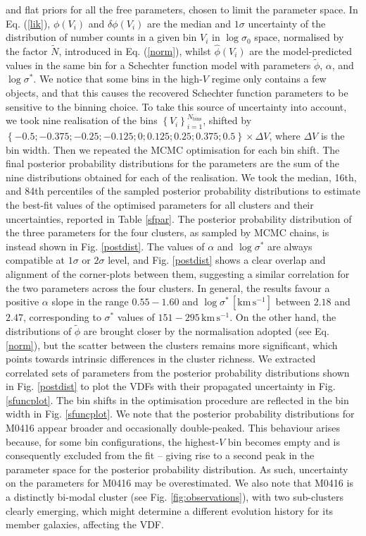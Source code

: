 \documentclass{aa}
\begin{document}
and flat priors for all the free parameters, chosen to limit the parameter space. In Eq. (\ref{lik}), $\phi(V_i)$ and $\delta\phi(V_i)$ are the median and $1\sigma$ uncertainty of the distribution of number counts in a given bin $V_i$ in $\log \sigma_0$ space, normalised by the factor $\tilde{N}$, introduced in Eq. (\ref{norm}), whilst $\hat{\phi}(V_i)$ are the model-predicted values in the same bin for a Schechter function model with parameters $\tilde{\phi}$, $\alpha$, and $\log\sigma^*$. We notice that some bins in the high-$V$ regime only contains a few objects, and that this causes the recovered Schechter function parameters to be sensitive to the binning choice. To take this source of uncertainty into account, we took nine realisation of the bins $\left\{ V_i \right\}_{i=1}^{N_\mathrm{bins}}$, shifted by $\left\{-0.5;-0.375;-0.25;-0.125;0;0.125;0.25;0.375;0.5 \right\} \times \Delta V$, where $\Delta V$ is the bin width. Then we repeated the MCMC optimisation for each bin shift. The final posterior probability distributions for the parameters are the sum of the nine distributions obtained for each of the realisation. We took the median, 16th, and 84th percentiles of the sampled posterior probability distributions to estimate the best-fit values of the optimised parameters for all clusters and their uncertainties, reported in Table \ref{sfpar}. The posterior probability distribution of the three parameters for the four clusters, as sampled by MCMC chains, is instead shown in Fig. \ref{postdist}. The values of $\alpha$ and $\log\sigma^*$ are always compatible at $1\sigma$ or $2\sigma$ level, and Fig. \ref{postdist} shows a clear overlap and alignment of the corner-plots between them, suggesting a similar correlation for the two parameters across the four clusters. In general, the results favour a positive $\alpha$ slope in the range $0.55-1.60$ and $\log\sigma^*\, [\mathrm{km\,s^{-1}}]$ between $2.18$ and $2.47$, corresponding to $\sigma^*$ values of $151-295 \, \mathrm{km \, s^{-1}}$. On the other hand, the distributions of $\tilde{\phi}$ are brought closer by the normalisation adopted (see Eq. \ref{norm}), but the scatter between the clusters remains more significant, which points towards intrinsic differences in the cluster richness. We extracted correlated sets of parameters from the posterior probability distributions shown in Fig. \ref{postdist} to plot the VDFs with their propagated uncertainty in Fig. \ref{sfuncplot}. The bin shifts in the optimisation procedure are reflected in the bin width in Fig. \ref{sfuncplot}. We note that the posterior probability distributions for M0416 appear broader and occasionally double-peaked. This behaviour arises because, for some bin configurations, the highest-$V$ bin becomes empty and is consequently excluded from the fit -- giving rise to a second peak in the parameter space for the posterior probability distribution. As such, uncertainty on the parameters for M0416 may be overestimated. We also note that M0416 is a distinctly bi-modal cluster (see Fig. \ref{fig:observations}), with two sub-clusters clearly emerging, which might determine a different evolution history for its member galaxies, affecting the VDF.
\end{document}
